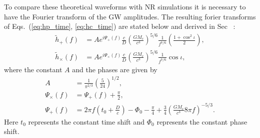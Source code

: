 \documentclass{ucdgradtaughtthesis}
\begin{document}
To compare these theoretical waveforms with NR simulations it is necessary to have the
Fourier transform of the GW amplitudes. The resulting forier transforms of Eqs.~(\ref{eq:hp_time}, \ref{eq:hc_time})
are stated below and derived in Sec~\cite[Sec.~4.1]{GRbook} :
\begin{subequations}
    \label{eq:hfreq}
    \begin{align}
        \tilde{h}_+(f) &= A e^{i \Psi_+(f)} \frac{c}{D} \left( \frac{G M_c}{c^3} \right)^{5/6} \frac{1}{f^{7/6}} \left( \frac{1 + \cos^2 \iota}{2} \right), \label{eq:hplus_freq} \\
        \tilde{h}_\times(f) &= A e^{i \Psi_\times(f)} \frac{c}{D} \left( \frac{G M_c}{c^3} \right)^{5/6} \frac{1}{f^{7/6}} \cos \iota, \label{eq:hcross_freq}
    \end{align}
\end{subequations}
%
%
where the constant \( A \) and the phases are given by
\begin{subequations}
    \begin{align}
        A &= \frac{1}{\pi^{2/3}} \left( \frac{5}{24} \right)^{1/2}, \label{eq:A_amp} \\
        \Psi_\times(f) &= \Psi_+(f) + \frac{\pi}{2}, \label{eq:psi_cross} \\
        \Psi_+(f) &= 2\pi f \left( t_0 + \frac{D}{c} \right) - \Phi_0 - \frac{\pi}{4} + \frac{3}{4} \left( \frac{G M_c}{c^3} 8\pi f \right)^{-5/3}. \label{eq:psi_plus}
    \end{align}
\end{subequations}
%
Here \( t_0 \) represents the constant time shift and \( \Phi_0 \) represents the constant phase shift.
%
\end{document}
